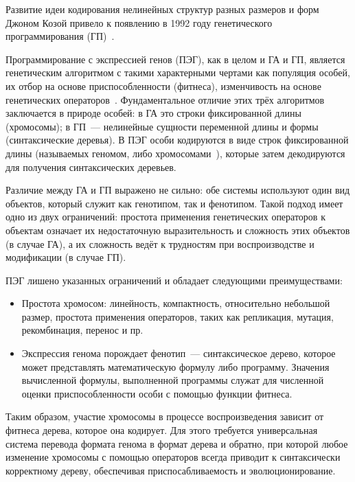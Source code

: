 Развитие идеи кодирования нелинейных структур разных размеров и форм Джоном Козой привело к появлению в 1992 году генетического программирования (ГП)~\cite{Koza92}.

Программирование с экспрессией генов (ПЭГ), как в целом и ГА и ГП, является генетическим алгоритмом с такими характерными чертами как популяция особей, их отбор на основе приспособленности (фитнеса), изменчивость на основе генетических операторов~\cite{Ferreira2001}. Фундаментальное отличие этих трёх алгоритмов заключается в природе особей: в ГА это строки фиксированной длины (хромосомы); в ГП~--- нелинейные сущности переменной длины и формы (синтаксические деревья). В ПЭГ особи кодируются в виде строк фиксированной длины (называемых геномом, либо хромосомами~\cite{ferreira:2001:wsc6Aa}), которые затем декодируются для получения синтаксических деревьев.

Различие между ГА и ГП выражено не сильно: обе системы используют один вид объектов, который служит как генотипом, так и фенотипом. Такой подход имеет одно из двух ограничений: простота применения генетических операторов к объектам означает их недостаточную выразительность и сложность этих объектов (в случае ГА), а их сложность ведёт к трудностям при воспроизводстве и модификации (в случае ГП).

ПЭГ лишено указанных ограничений и обладает следующими преимуществами:
\begin{itemize}
  \item Простота хромосом: линейность, компактность, относительно небольшой размер, простота применения операторов, таких как репликация, мутация, рекомбинация, перенос и пр.
  \item Экспрессия генома порождает фенотип~--- синтаксическое дерево, которое может представлять математическую формулу либо программу. Значения вычисленной формулы, выполненной программы служат для численной оценки приспособленности особи с помощью функции фитнеса.
\end{itemize}

Таким образом, участие хромосомы в процессе воспроизведения зависит от фитнеса дерева, которое она кодирует. Для этого требуется универсальная система перевода формата генома в формат дерева и обратно, при которой любое изменение хромосомы с помощью операторов всегда приводит к синтаксически корректному дереву, обеспечивая приспосабливаемость и эволюционирование.






